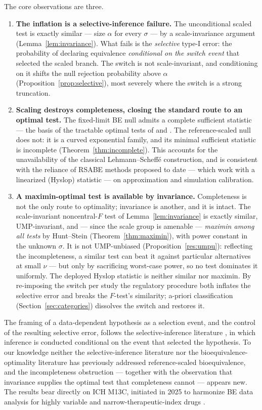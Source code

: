 \documentclass[11pt]{article}
\theoremstyle{remark}
\begin{document}
The core observations are three.
\begin{enumerate}
\item[(i)] \textbf{The inflation is a selective-inference failure.} The unconditional scaled test is exactly similar --- size $\alpha$ for every $\sigma$ --- by a scale-invariance argument (Lemma~\ref{lem:invariance}). What fails is the \emph{selective} type-I error: the probability of declaring equivalence \emph{conditional on the switch event} that selected the scaled branch. The switch is not scale-invariant, and conditioning on it shifts the null rejection probability above $\alpha$ (Proposition~\ref{prop:selective}), most severely where the switch is a strong truncation.
\item[(ii)] \textbf{Scaling destroys completeness, closing the standard route to an optimal test.} The fixed-limit BE null admits a complete sufficient statistic --- the basis of the tractable optimal tests of \citet{bhm1997} and \citet{bergerhsu1996}. The reference-scaled null does not: it is a curved exponential family, and its minimal sufficient statistic is incomplete (Theorem~\ref{thm:incomplete}). This accounts for the unavailability of the classical Lehmann--Scheff\'e construction, and is consistent with the reliance of RSABE methods proposed to date --- which work with a linearized (Hyslop) statistic --- on approximation and simulation calibration.
\item[(iii)] \textbf{A maximin-optimal test is available by invariance.} Completeness is not the only route to optimality; invariance is another, and it is intact. The scale-invariant noncentral-$F$ test of Lemma~\ref{lem:invariance} is exactly similar, UMP-invariant, and --- since the scale group is amenable --- \emph{maximin among all tests} by Hunt--Stein (Theorem~\ref{thm:maximin}), with power constant in the unknown $\sigma$. It is not UMP-unbiased (Proposition~\ref{res:umpu}): reflecting the incompleteness, a similar test can beat it against particular alternatives at small $\nu$ --- but only by sacrificing worst-case power, so no test dominates it uniformly. The deployed Hyslop statistic is neither similar nor maximin. By re-imposing the switch per study the regulatory procedure both inflates the selective error and breaks the $F$-test's similarity; a-priori classification (Section~\ref{sec:categories}) dissolves the switch and restores it.
\end{enumerate}

The framing of a data-dependent hypothesis as a selection event, and the control of the resulting selective error, follows the selective-inference literature \citep{fithian2014, lee2016, taylor2015}, in which inference is conducted conditional on the event that selected the hypothesis. To our knowledge neither the selective-inference literature nor the bioequivalence-optimality literature \citep{schuirmann1987, bergerhsu1996, bhm1997, brown1995} has previously addressed reference-scaled bioequivalence, and the incompleteness obstruction --- together with the observation that invariance supplies the optimal test that completeness cannot --- appears new. The results bear directly on ICH M13C, initiated in 2025 to harmonize BE data analysis for highly variable and narrow-therapeutic-index drugs \citep{ich_m13}.
\end{document}
